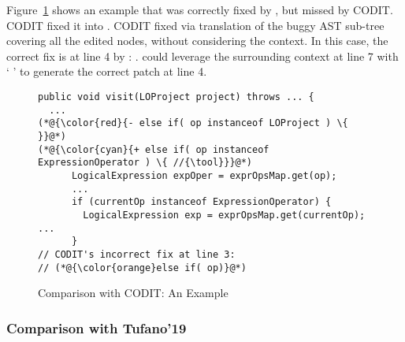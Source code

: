 Figure~\ref{example_codit} shows an example that was correctly fixed
by {\tool}, but missed by CODIT. CODIT fixed it into 
 . CODIT fixed via translation of the buggy AST
sub-tree covering all the edited nodes, without considering the
context. In this case, the correct fix is at line 4 by {\tool}:
   
. {\tool} could leverage the surrounding
context at line 7 with ` 
' to generate the correct patch at line 4.



\begin{figure}[t]
	\centering
	\begin{lstlisting}[]
public void visit(LOProject project) throws ... {
  ...
(*@{\color{red}{- else if( op instanceof LOProject ) \{ }}@*)
(*@{\color{cyan}{+ else if( op instanceof ExpressionOperator ) \{ //{\tool}}}@*)
      LogicalExpression expOper = exprOpsMap.get(op);
      ...
      if (currentOp instanceof ExpressionOperator) {
        LogicalExpression exp = exprOpsMap.get(currentOp); ...
      }
// CODIT's incorrect fix at line 3:
// (*@{\color{orange}else if( op)}@*) 
	\end{lstlisting}
        \vspace{-17pt}
	\caption{Comparison with CODIT: An Example}
	\label{example_codit}
\end{figure}

\subsubsection{\bf Comparison with Tufano'19}



